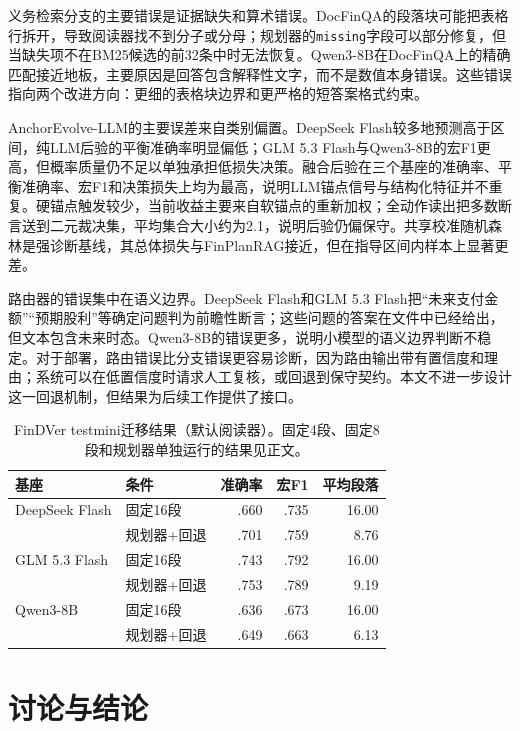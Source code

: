 义务检索分支的主要错误是证据缺失和算术错误。DocFinQA的段落块可能把表格行拆开，导致阅读器找不到分子或分母；规划器的\texttt{missing}字段可以部分修复，但当缺失项不在BM25候选的前32条中时无法恢复。Qwen3-8B在DocFinQA上的精确匹配接近地板，主要原因是回答包含解释性文字，而不是数值本身错误。这些错误指向两个改进方向：更细的表格块边界和更严格的短答案格式约束。

AnchorEvolve-LLM的主要误差来自类别偏置。DeepSeek Flash较多地预测高于区间，纯LLM后验的平衡准确率明显偏低；GLM 5.3 Flash与Qwen3-8B的宏F1更高，但概率质量仍不足以单独承担低损失决策。融合后验在三个基座的准确率、平衡准确率、宏F1和决策损失上均为最高，说明LLM锚点信号与结构化特征并不重复。硬锚点触发较少，当前收益主要来自软锚点的重新加权；全动作读出把多数断言送到二元裁决集，平均集合大小约为2.1，说明后验仍偏保守。共享校准随机森林是强诊断基线，其总体损失与FinPlanRAG接近，但在指导区间内样本上显著更差。

路由器的错误集中在语义边界。DeepSeek Flash和GLM 5.3 Flash把“未来支付金额”“预期股利”等确定问题判为前瞻性断言；这些问题的答案在文件中已经给出，但文本包含未来时态。Qwen3-8B的错误更多，说明小模型的语义边界判断不稳定。对于部署，路由错误比分支错误更容易诊断，因为路由输出带有置信度和理由；系统可以在低置信度时请求人工复核，或回退到保守契约。本文不进一步设计这一回退机制，但结果为后续工作提供了接口。

\begin{table}[H]
\centering
{}
\setlength{\tabcolsep}{4pt}
\caption{FinDVer testmini迁移结果（默认阅读器）。固定4段、固定8段和规划器单独运行的结果见正文。}
\label{tab:findver}
\begin{tabular}{llrrr}
\toprule
基座 & 条件 & 准确率 & 宏F1 & 平均段落 \\
\midrule
DeepSeek Flash & 固定16段 & .660 & .735 & 16.00 \\
 & 规划器+回退 & .701 & .759 & 8.76 \\
GLM 5.3 Flash & 固定16段 & .743 & .792 & 16.00 \\
 & 规划器+回退 & .753 & .789 & 9.19 \\
Qwen3-8B & 固定16段 & .636 & .673 & 16.00 \\
 & 规划器+回退 & .649 & .663 & 6.13 \\
\bottomrule
\end{tabular}
\end{table}

\chapter{讨论与结论}
\label{ch:conclusion}

